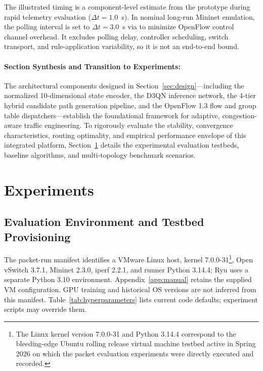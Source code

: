 \documentclass[12pt,a4paper,oneside]{report}
\newcommand{\code}[1]{\relax\ifmmode\text{\ttfamily\nolinkurl{#1}}\else{\ttfamily\nolinkurl{#1}}\fi}
\begin{document}
The illustrated timing is a component-level estimate from the prototype during rapid telemetry evaluation ($\Delta t = 1.0$~s). In nominal long-run Mininet emulation, the polling interval is set to $\Delta t = 3.0$~s via \code{config.py} to minimize OpenFlow control channel overhead. It excludes polling delay, controller scheduling, switch transport, and rule-application variability, so it is not an end-to-end bound.

\paragraph{Section Synthesis and Transition to Experiments:}
The architectural components designed in Section~\ref{sec:design}---including the normalized 10-dimensional state encoder, the D3QN inference network, the 4-tier hybrid candidate path generation pipeline, and the OpenFlow 1.3 flow and group table dispatchers---establish the foundational framework for adaptive, congestion-aware traffic engineering. To rigorously evaluate the stability, convergence characteristics, routing optimality, and empirical performance envelope of this integrated platform, Section~\ref{sec:experiments} details the experimental evaluation testbeds, baseline algorithms, and multi-topology benchmark scenarios.

\section{Experiments}
\label{sec:experiments}

\subsection{Evaluation Environment and Testbed Provisioning}
The packet-run manifest identifies a VMware Linux host, kernel 7.0.0-31\footnote{The Linux kernel version 7.0.0-31 and Python 3.14.4 correspond to the bleeding-edge Ubuntu rolling release virtual machine testbed active in Spring 2026 on which the packet evaluation experiments were directly executed and recorded.}, Open vSwitch 3.7.1, Mininet 2.3.0, iperf 2.2.1, and runner Python 3.14.4; Ryu uses a separate Python 3.10 environment. Appendix~\ref{app:manual} retains the supplied VM configuration. GPU training and historical OS versions are not inferred from this manifest. Table~\ref{tab:hyperparameters} lists current code defaults; experiment scripts may override them.
\end{document}
